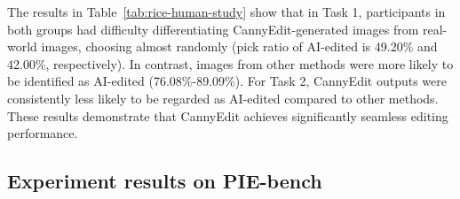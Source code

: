 \documentclass{article}
\begin{document}
The results in Table~\ref{tab:rice-human-study} show that in Task 1, participants in both groups had difficulty differentiating CannyEdit-generated images from real-world images, choosing almost randomly (pick ratio of AI-edited is 49.20\% and 42.00\%, respectively). In contrast, images from other methods were more likely to be identified as AI-edited (76.08\%-89.09\%). For Task 2, CannyEdit outputs were consistently less likely to be regarded as AI-edited compared to other methods. These results demonstrate that CannyEdit achieves significantly seamless editing performance.






 

\subsection{Experiment results on PIE-bench}
\end{document}
